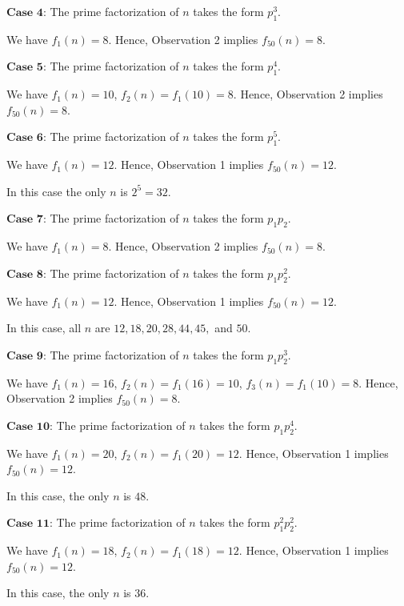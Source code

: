 \begin{enumerate}
 $\textbf{Case 4}$: The prime factorization of $n$ takes the form $p_1^3$.

 We have $f_1 \left( n \right) = 8$. Hence, Observation 2 implies $f_{50} \left( n \right) = 8$.

 $\textbf{Case 5}$: The prime factorization of $n$ takes the form $p_1^4$.

 We have $f_1 \left( n \right) = 10$, $f_2 \left( n \right) = f_1 \left( 10 \right) = 8$. Hence, Observation 2 implies $f_{50} \left( n \right) = 8$.

 $\textbf{Case 6}$: The prime factorization of $n$ takes the form $p_1^5$.

 We have $f_1 \left( n \right) = 12$. Hence, Observation 1 implies $f_{50} \left( n \right) = 12$.

 In this case the only $n$ is $2^5 = 32$.

 $\textbf{Case 7}$: The prime factorization of $n$ takes the form $p_1 p_2$.

 We have $f_1 \left( n \right) = 8$. Hence, Observation 2 implies $f_{50} \left( n \right) = 8$.

 $\textbf{Case 8}$: The prime factorization of $n$ takes the form $p_1 p_2^2$.

 We have $f_1 \left( n \right) = 12$. Hence, Observation 1 implies $f_{50} \left( n \right) = 12$.

 In this case, all $n$ are $12, 18, 20, 28, 44, 45,$ and $50$.

 $\textbf{Case 9}$: The prime factorization of $n$ takes the form $p_1 p_2^3$.

 We have $f_1 \left( n \right) = 16$, $f_2 \left( n \right) = f_1 \left( 16 \right) = 10$, $f_3 \left( n \right) = f_1 \left( 10 \right) = 8$. Hence, Observation 2 implies $f_{50} \left( n \right) = 8$.

 $\textbf{Case 10}$: The prime factorization of $n$ takes the form $p_1 p_2^4$.

 We have $f_1 \left( n \right) = 20$, $f_2 \left( n \right) = f_1 \left( 20 \right) = 12$. Hence, Observation 1 implies $f_{50} \left( n \right) = 12$.

 In this case, the only $n$ is $48$.

 $\textbf{Case 11}$: The prime factorization of $n$ takes the form $p_1^2 p_2^2$.

 We have $f_1 \left( n \right) = 18$, $f_2 \left( n \right) = f_1 \left( 18 \right) = 12$. Hence, Observation 1 implies $f_{50} \left( n \right) = 12$.

 In this case, the only $n$ is $36$.


\end{enumerate}

